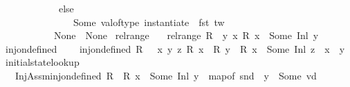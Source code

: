 \begin{isabellebody}
\ \ \ \ \ \ \ \ \ \ \ \ else\ \isanewline
\ \ \ \ \ \ \ \ \ \ \ \ \ \ {\isacharparenleft}{\kern0pt}\ Some\ {\isacharparenleft}{\kern0pt}val{\isacharunderscore}{\kern0pt}of{\isacharunderscore}{\kern0pt}type\ {\isacharparenleft}{\kern0pt}instantiate\ {\isasymOmega}\ {\isacharparenleft}{\kern0pt}fst\ tw{\isacharparenright}{\kern0pt}{\isacharparenright}{\kern0pt}{\isacharparenright}{\kern0pt}{\isacharparenright}{\kern0pt}\ \ \ \ \ \ \ \ \ \ \ \ \ \isanewline
\ \ \ \ \ \ \ \ \ \ \ {\isacharparenright}{\kern0pt}\isanewline
\ \ \ \ \ \ \ \ \ \ {\isacharbar}{\kern0pt}\ None\ {\isasymRightarrow}\ None{\isacharparenright}{\kern0pt}{\isachardoublequoteclose}\isanewline
\isanewline
{}\isamarkupfalse%
\ rel{\isacharunderscore}{\kern0pt}range\isanewline
\ \ \ {\isachardoublequoteopen}rel{\isacharunderscore}{\kern0pt}range\ R\ {\isacharequal}{\kern0pt}\ {\isacharbraceleft}{\kern0pt}y{\isachardot}{\kern0pt}\ {\isasymexists}x{\isachardot}{\kern0pt}\ R\ x\ {\isacharequal}{\kern0pt}\ Some\ {\isacharparenleft}{\kern0pt}Inl\ y{\isacharparenright}{\kern0pt}{\isacharbraceright}{\kern0pt}{\isachardoublequoteclose}\isanewline
\isanewline
{}\isamarkupfalse%
\ inj{\isacharunderscore}{\kern0pt}on{\isacharunderscore}{\kern0pt}defined\ \isanewline
\ \ \ {\isachardoublequoteopen}inj{\isacharunderscore}{\kern0pt}on{\isacharunderscore}{\kern0pt}defined\ R\ {\isacharequal}{\kern0pt}\ {\isacharparenleft}{\kern0pt}{\isasymforall}\ x\ y\ z{\isachardot}{\kern0pt}\ R\ x\ {\isacharequal}{\kern0pt}\ R\ y\ {\isasymand}\ R\ x\ {\isacharequal}{\kern0pt}\ Some\ {\isacharparenleft}{\kern0pt}Inl\ z{\isacharparenright}{\kern0pt}\ {\isasymlongrightarrow}\ x\ {\isacharequal}{\kern0pt}\ y{\isacharparenright}{\kern0pt}{\isachardoublequoteclose}\isanewline
\isanewline
{}\isamarkupfalse%
\ initial{\isacharunderscore}{\kern0pt}state{\isacharunderscore}{\kern0pt}lookup{\isacharcolon}{\kern0pt}\ \isanewline
\ \ \ InjAssm{\isacharcolon}{\kern0pt}{\isachardoublequoteopen}inj{\isacharunderscore}{\kern0pt}on{\isacharunderscore}{\kern0pt}defined\ R{\isachardoublequoteclose}\ \ {\isachardoublequoteopen}R\ x\ {\isacharequal}{\kern0pt}\ Some\ {\isacharparenleft}{\kern0pt}Inl\ y{\isacharparenright}{\kern0pt}{\isachardoublequoteclose}\ \ {\isachardoublequoteopen}map{\isacharunderscore}{\kern0pt}of\ {\isacharparenleft}{\kern0pt}snd\ {\isasymLambda}{\isacharprime}{\kern0pt}{\isacharparenright}{\kern0pt}\ y\ {\isacharequal}{\kern0pt}\ Some\ vd{\isachardoublequoteclose}\isanewline

\end{isabellebody}
